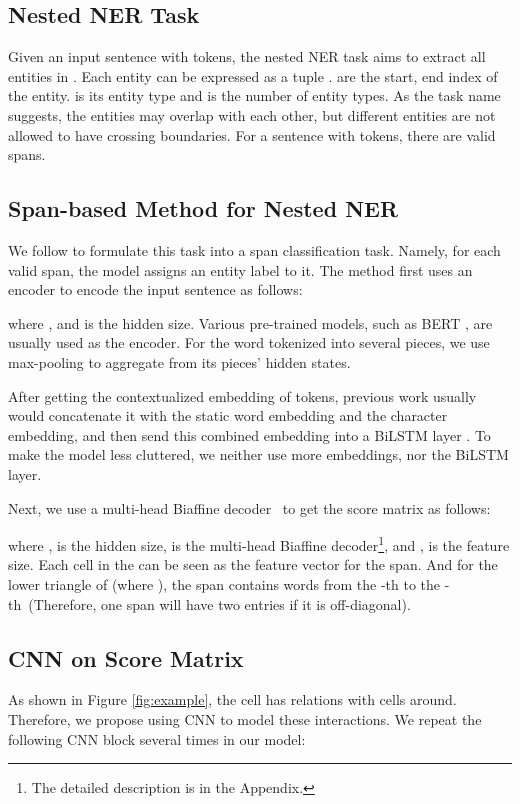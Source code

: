 \documentclass[11pt]{article}
\begin{document}
\subsection{Nested NER Task}
Given an input sentence  with  tokens, 
the nested NER task aims to extract all entities in . Each entity can be expressed as a tuple .  are the start, end index of the entity.  is its entity type and  is the number of entity types. 
As the task name suggests, the entities may overlap with each other, but different entities are not allowed to have crossing boundaries. For a sentence with  tokens, there are  valid spans. 

\subsection{Span-based Method for Nested NER}
We follow \citet{DBLP:conf/acl/YuBP20} to formulate this task into a span classification task. Namely, for each valid span, the model assigns an entity label to it. The method first uses an encoder to encode the input sentence as follows:

where , and  is the hidden size. Various pre-trained models, such as BERT \cite{DBLP:conf/naacl/DevlinCLT19}, are usually used as the encoder. For the word tokenized into several pieces, we use max-pooling to aggregate from its pieces' hidden states.

After getting the contextualized embedding of tokens, previous work usually would concatenate it with the static word embedding and the character embedding, and then send this combined embedding into a BiLSTM layer \cite{DBLP:conf/acl/YuBP20,DBLP:conf/acl/WanR0022,DBLP:conf/acl/0002THH22}. To make the model less cluttered, we neither use more embeddings, nor the BiLSTM layer. 

Next, we use a multi-head Biaffine decoder~\cite{DBLP:conf/iclr/DozatM17,DBLP:conf/nips/VaswaniSPUJGKP17} to get the score matrix as follows:

where ,  is the hidden size,  is the multi-head Biaffine decoder\footnote{The detailed description is in the Appendix.}, and ,  is the feature size. Each cell  in the  can be seen as the feature vector  for the span. And for the lower triangle of  (where ), the span contains words from the -th to the -th~(Therefore, one span will have two entries if it is off-diagonal).



\subsection{CNN on Score Matrix}
As shown in Figure \ref{fig:example}, the cell has relations with cells around. Therefore, we propose using CNN to model these interactions. We repeat the following CNN block several times in our model:
\end{document}
